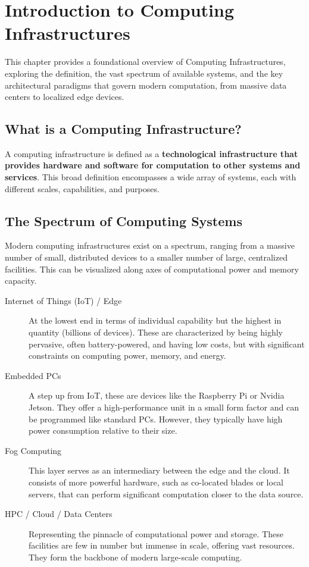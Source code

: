 \chapter{Introduction to Computing Infrastructures}

This chapter provides a foundational overview of Computing Infrastructures, exploring the definition, the vast spectrum of available systems, and the key architectural paradigms that govern modern computation, from massive data centers to localized edge devices.

\section{What is a Computing Infrastructure?}
A computing infrastructure is defined as a \textbf{technological infrastructure that provides hardware and software for computation to other systems and services}. This broad definition encompasses a wide array of systems, each with different scales, capabilities, and purposes.

\section{The Spectrum of Computing Systems}
Modern computing infrastructures exist on a spectrum, ranging from a massive number of small, distributed devices to a smaller number of large, centralized facilities. This can be visualized along axes of computational power and memory capacity.

\begin{description}
    \item[Internet of Things (IoT) / Edge] At the lowest end in terms of individual capability but the highest in quantity (billions of devices). These are characterized by being highly pervasive, often battery-powered, and having low costs, but with significant constraints on computing power, memory, and energy.
    \item[Embedded PCs] A step up from IoT, these are devices like the Raspberry Pi or Nvidia Jetson. They offer a high-performance unit in a small form factor and can be programmed like standard PCs. However, they typically have high power consumption relative to their size.
    \item[Fog Computing] This layer serves as an intermediary between the edge and the cloud. It consists of more powerful hardware, such as co-located blades or local servers, that can perform significant computation closer to the data source.
    \item[HPC / Cloud / Data Centers] Representing the pinnacle of computational power and storage. These facilities are few in number but immense in scale, offering vast resources. They form the backbone of modern large-scale computing.
\end{description}


